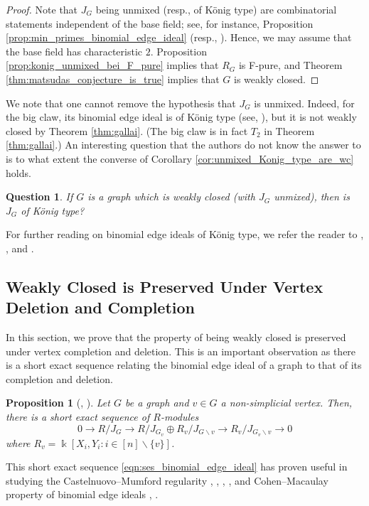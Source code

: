 \documentclass[12pt,a4paper]{amsart}
\theoremstyle{plain}
\newtheorem{prop}[thrm]{Proposition}
\def\bprop{\begin{prop}}
\def\eprop{\end{prop}}
\newtheorem{ques}[thrm]{Question}
\def\bques{\begin{ques}}
\def\eques{\end{ques}}
\theoremstyle{definition}
\def\bproof{\begin{proof}}
\def\eproof{\end{proof}}
\theoremstyle{remark}
\let\ra=\rightarrow
\let\setminus=\smallsetminus
\def\k{\Bbbk}
\begin{document}
\bproof
Note that $J_{G}$ being unmixed (resp., of K\"onig type) are combinatorial statements independent of the base field; see, for instance, Proposition \ref{prop:min_primes_binomial_edge_ideal} (resp., \cite{laclair2023invariants}). Hence, we may assume that the base field has characteristic $2$. Proposition \ref{prop:konig_unmixed_bei_F_pure} implies that $R_{G}$ is F-pure, and Theorem \ref{thm:matsudas_conjecture_is_true} implies that $G$ is weakly closed.
\eproof

We note that one cannot remove the hypothesis that $J_{G}$ is unmixed. Indeed, for the big claw, its binomial edge ideal is of K\"onig type (see, {\cite[Theorem 5.6]{laclair2023invariants}}), but it is not weakly closed by Theorem \ref{thm:gallai}. (The big claw is in fact $T_{2}$ in Theorem \ref{thm:gallai}.) An interesting question that the authors do not know the answer to is to what extent the converse of Corollary \ref{cor:unmixed_Konig_type_are_wc} holds.

\bques
If $G$ is a graph which is weakly closed (with $J_{G}$ unmixed), then is $J_{G}$ of K\"onig type?
\eques 

For further reading on binomial edge ideals of K\"onig type, we refer the reader to \cite{herzog2022graded}, \cite{laclair2023invariants}, and \cite{williams2023lf}.

\subsection{Weakly Closed is Preserved Under Vertex Deletion and Completion}

In this section, we prove that the property of being weakly closed is preserved under vertex completion and deletion. This is an important observation as there is a short exact sequence relating the binomial edge ideal of a graph to that of its completion and deletion.

\bprop[{\cite[Lemma 4.8]{ohtani2011graphs}}, {\cite[Formula 1]{kumar2020depth}}]
\label{lem:exact_sequence_binomial_edge_ideal}
Let $G$ be a graph and $v \in G$ a non-simplicial vertex. Then, there is a short exact sequence of $R$-modules
\begin{equation}
\label{eqn:ses_binomial_edge_ideal}
    0 \ra R/J_{G} \ra R/J_{G_{v}} \oplus R_{v}/J_{G \setminus v} \ra R_{v}/J_{G_{v} \setminus v} \ra 0
\end{equation}
where $R_{v} = \k[X_{i},Y_{i} : i \in [n] \setminus \{v\}]$.
\eprop

This short exact sequence  \eqref{eqn:ses_binomial_edge_ideal} has proven useful in studying the Castelnuovo--Mumford regularity \cite{kumar2020regularity}, \cite{kumar2021binomial}, \cite{kumar2020depth}, \cite{laclair2024regularity}, \cite{laclair2024new} and Cohen--Macaulay property of binomial edge ideals \cite{bolognini2018binomial}, \cite{bolognini2022cohen}.
\end{document}
